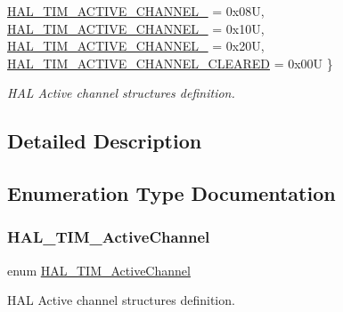 \begin{DoxyCompactItemize}
\mbox{\hyperlink{group___t_i_m___exported___types_ggaa3fa7bcbb4707f1151ccfc90a8cf9706a7d98ec7e385cacb3aaa6cec601fa6ab6}{H\+A\+L\+\_\+\+T\+I\+M\+\_\+\+A\+C\+T\+I\+V\+E\+\_\+\+C\+H\+A\+N\+N\+E\+L\+\_}} = 0x08U, 
\newline
\mbox{\hyperlink{group___t_i_m___exported___types_ggaa3fa7bcbb4707f1151ccfc90a8cf9706a50b9b4be055407e9f566d8da0a7e07cc}{H\+A\+L\+\_\+\+T\+I\+M\+\_\+\+A\+C\+T\+I\+V\+E\+\_\+\+C\+H\+A\+N\+N\+E\+L\+\_}} = 0x10U, 
\mbox{\hyperlink{group___t_i_m___exported___types_ggaa3fa7bcbb4707f1151ccfc90a8cf9706a368a574b486286c87f763957a0ef9d93}{H\+A\+L\+\_\+\+T\+I\+M\+\_\+\+A\+C\+T\+I\+V\+E\+\_\+\+C\+H\+A\+N\+N\+E\+L\+\_}} = 0x20U, 
\mbox{\hyperlink{group___t_i_m___exported___types_ggaa3fa7bcbb4707f1151ccfc90a8cf9706a574f72ac3bb41fe660318aa42dfdc98d}{H\+A\+L\+\_\+\+T\+I\+M\+\_\+\+A\+C\+T\+I\+V\+E\+\_\+\+C\+H\+A\+N\+N\+E\+L\+\_\+\+C\+L\+E\+A\+R\+ED}} = 0x00U
 \}
\begin{DoxyCompactList}\small\item\em H\+AL Active channel structures definition. \end{DoxyCompactList}\end{DoxyCompactItemize}


\subsection{Detailed Description}


\subsection{Enumeration Type Documentation}
\mbox{\label{group___t_i_m___exported___types_gaa3fa7bcbb4707f1151ccfc90a8cf9706}} 
\subsubsection{\texorpdfstring{HAL\_TIM\_ActiveChannel}{HAL\_TIM\_ActiveChannel}}
{\footnotesize\ttfamily enum \mbox{\hyperlink{group___t_i_m___exported___types_gaa3fa7bcbb4707f1151ccfc90a8cf9706}{H\+A\+L\+\_\+\+T\+I\+M\+\_\+\+Active\+Channel}}}



H\+AL Active channel structures definition. 

